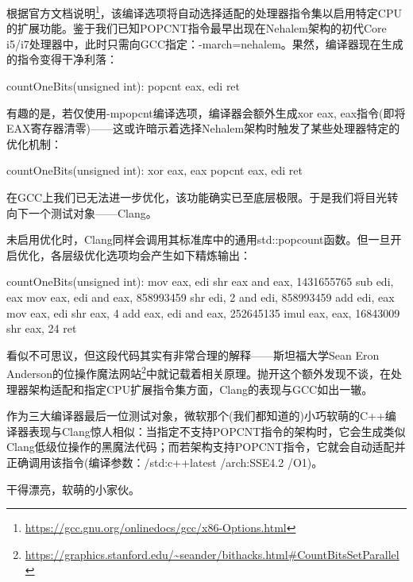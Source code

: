 根据官方文档说明\footnote{\url{https://gcc.gnu.org/onlinedocs/gcc/x86-Options.html}}，该编译选项将自动选择适配的处理器指令集以启用特定CPU的扩展功能。鉴于我们已知POPCNT指令最早出现在Nehalem架构的初代Core i5/i7处理器中，此时只需向GCC指定：-march=nehalem。果然，编译器现在生成的指令变得干净利落：

\begin{shell}
countOneBits(unsigned int):
  popcnt eax, edi
  ret
\end{shell}

有趣的是，若仅使用-mpopcnt编译选项，编译器会额外生成xor eax, eax指令(即将EAX寄存器清零)——这或许暗示着选择Nehalem架构时触发了某些处理器特定的优化机制：

\begin{shell}
countOneBits(unsigned int):
  xor eax, eax
  popcnt eax, edi
  ret
\end{shell}

在GCC上我们已无法进一步优化，该功能确实已至底层极限。于是我们将目光转向下一个测试对象——Clang。

未启用优化时，Clang同样会调用其标准库中的通用std::popcount函数。但一旦开启优化，各层级优化选项均会产生如下精炼输出：

\begin{shell}
countOneBits(unsigned int):
  mov eax, edi
  shr eax
  and eax, 1431655765
  sub edi, eax
  mov eax, edi
  and eax, 858993459
  shr edi, 2
  and edi, 858993459
  add edi, eax
  mov eax, edi
  shr eax, 4
  add eax, edi
  and eax, 252645135
  imul eax, eax, 16843009
  shr eax, 24
  ret
\end{shell}

看似不可思议，但这段代码其实有非常合理的解释——斯坦福大学Sean Eron Anderson的位操作魔法网站\footnote{\url{https://graphics.stanford.edu/~seander/bithacks.html\#CountBitsSetParallel}}中就记载着相关原理。抛开这个额外发现不谈，在处理器架构适配和指定CPU扩展指令集方面，Clang的表现与GCC如出一辙。

作为三大编译器最后一位测试对象，微软那个(我们都知道的)小巧软萌的C++编译器表现与Clang惊人相似：当指定不支持POPCNT指令的架构时，它会生成类似Clang低级位操作的黑魔法代码；而若架构支持POPCNT指令，它就会自动适配并正确调用该指令(编译参数：/std:c++latest /arch:SSE4.2 /O1)。

干得漂亮，软萌的小家伙。


























